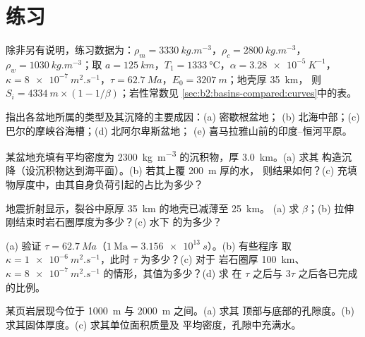 \section*{练习}\label{sec:b2:basins-compared:exercises}

除非另有说明，练习数据为：$\rho_m = \qty{3330}{kg.m^{-3}}$，$\rho_c =
\qty{2800}{kg.m^{-3}}$，$\rho_w = \qty{1030}{kg.m^{-3}}$；取 $a =
\qty{125}{km}$，$T_1 = \qty{1333}{\celsius}$，$\alpha = \qty{3.28e-5}{K^{-1}}$，$\kappa =
\qty{8e-7}{m^2.s^{-1}}$，$\tau = \qty{62.7}{Ma}$，$E_0 = \qty{3207}{m}$；地壳厚 \qty{35}{km}，
则 $S_i = \qty{4334}{m}\times(1 - 1/\beta)$；岩性常数见
\cref{sec:b2:basins-compared:curves}中的表。

\begin{exercise}[$\star$]\label{exo:b2:basins-compared:1}
指出各盆地所属的类型及其沉降的主要成因：(a) 密歇根盆地；
(b) 北海中部；(c) 巴尔的摩峡谷海槽；(d) 北阿尔卑斯盆地；
(e) 喜马拉雅山前的印度–恒河平原。
\end{exercise}

\begin{exercise}[$\star$]\label{exo:b2:basins-compared:2}
某盆地充填有平均密度为 \qty{2300}{kg.m^{-3}} 的沉积物，厚 \qty{3.0}{km}。(a) 求其
构造沉降（设沉积物达到海平面）。(b) 若其上覆 \qty{200}{m} 厚的水，
则结果如何？(c) 充填物厚度中，由其自身负荷引起的占比为多少？
\end{exercise}

\begin{exercise}[$\star$]\label{exo:b2:basins-compared:3}
地震折射显示，裂谷中原厚 \qty{35}{km} 的地壳已减薄至 \qty{25}{km}。
(a) 求 $\beta$；(b) 拉伸刚结束时岩石圈厚度为多少？(c) 水下
的为多少？
\end{exercise}

\begin{exercise}[$\star$]\label{exo:b2:basins-compared:4}
(a) 验证 $\tau = \qty{62.7}{Ma}$（$1~\text{Ma} = \qty{3.156e13}{s}$）。(b) 有些程序
取 $\kappa = \qty{1e-6}{m^2.s^{-1}}$，此时 $\tau$ 为多少？(c) 对于
岩石圈厚 \qty{100}{km}、$\kappa = \qty{8e-7}{m^2.s^{-1}}$ 的情形，其值为多少？(d) 求
在 $\tau$ 之后与 $3\tau$ 之后各已完成的比例。
\end{exercise}

\begin{exercise}[$\star\star$]\label{exo:b2:basins-compared:5}
某页岩层现今位于 \qty{1000}{m} 与 \qty{2000}{m} 之间。(a) 求其
顶部与底部的孔隙度。(b) 求其固体厚度。(c) 求其单位面积质量及
平均密度，孔隙中充满水。
\end{exercise}

